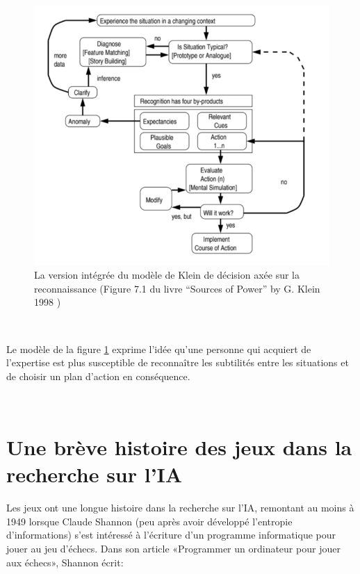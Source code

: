 \begin{figure}[th]
\centering
\includegraphics{Figures/klein.PNG}
\decoRule
\caption[ La version intégrée  du modèle de Klein de décision axée sur la reconnaissance] { La version intégrée  du modèle de Klein de décision axée sur la reconnaissance
(Figure 7.1 du livre “Sources of Power” by G. Klein 1998 \parencite{klein2017sources}) }
\label{fig:klein}
\end{figure}


~\par
Le modèle de la figure \ref{fig:klein} exprime l’idée qu’une personne qui acquiert de l’expertise est plus susceptible 
de reconnaître les subtilités entre les situations et de choisir un plan d’action en conséquence.



~\par

\section{Une brève histoire des jeux dans la recherche sur l'IA}

Les jeux ont une longue histoire dans la recherche sur l'IA, remontant au moins à 1949 lorsque Claude Shannon (peu après avoir développé l'entropie d'informations) s'est intéressé à l'écriture d'un programme informatique pour jouer au jeu d'échecs. Dans son article «Programmer un ordinateur pour jouer aux échecs», Shannon écrit:

